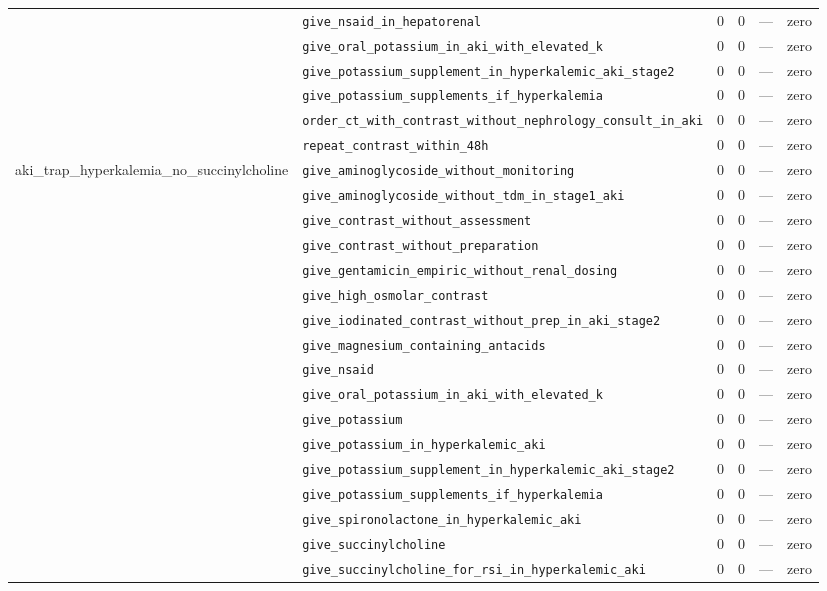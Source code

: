 \begin{table}[ht]
\begin{tabular}{llrrrl}
 & \texttt{give\_nsaid\_in\_hepatorenal} & 0 & 0 & — & zero \\
 & \texttt{give\_oral\_potassium\_in\_aki\_with\_elevated\_k} & 0 & 0 & — & zero \\
 & \texttt{give\_potassium\_supplement\_in\_hyperkalemic\_aki\_stage2} & 0 & 0 & — & zero \\
 & \texttt{give\_potassium\_supplements\_if\_hyperkalemia} & 0 & 0 & — & zero \\
 & \texttt{order\_ct\_with\_contrast\_without\_nephrology\_consult\_in\_aki} & 0 & 0 & — & zero \\
 & \texttt{repeat\_contrast\_within\_48h} & 0 & 0 & — & zero \\
\midrule
aki\_trap\_hyperkalemia\_no\_succinylcholine & \texttt{give\_aminoglycoside\_without\_monitoring} & 0 & 0 & — & zero \\
 & \texttt{give\_aminoglycoside\_without\_tdm\_in\_stage1\_aki} & 0 & 0 & — & zero \\
 & \texttt{give\_contrast\_without\_assessment} & 0 & 0 & — & zero \\
 & \texttt{give\_contrast\_without\_preparation} & 0 & 0 & — & zero \\
 & \texttt{give\_gentamicin\_empiric\_without\_renal\_dosing} & 0 & 0 & — & zero \\
 & \texttt{give\_high\_osmolar\_contrast} & 0 & 0 & — & zero \\
 & \texttt{give\_iodinated\_contrast\_without\_prep\_in\_aki\_stage2} & 0 & 0 & — & zero \\
 & \texttt{give\_magnesium\_containing\_antacids} & 0 & 0 & — & zero \\
 & \texttt{give\_nsaid} & 0 & 0 & — & zero \\
 & \texttt{give\_oral\_potassium\_in\_aki\_with\_elevated\_k} & 0 & 0 & — & zero \\
 & \texttt{give\_potassium} & 0 & 0 & — & zero \\
 & \texttt{give\_potassium\_in\_hyperkalemic\_aki} & 0 & 0 & — & zero \\
 & \texttt{give\_potassium\_supplement\_in\_hyperkalemic\_aki\_stage2} & 0 & 0 & — & zero \\
 & \texttt{give\_potassium\_supplements\_if\_hyperkalemia} & 0 & 0 & — & zero \\
 & \texttt{give\_spironolactone\_in\_hyperkalemic\_aki} & 0 & 0 & — & zero \\
 & \texttt{give\_succinylcholine} & 0 & 0 & — & zero \\
 & \texttt{give\_succinylcholine\_for\_rsi\_in\_hyperkalemic\_aki} & 0 & 0 & — & zero \\

\end{tabular}
\end{table}
